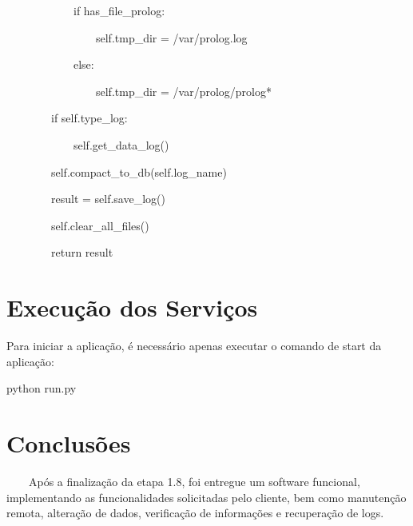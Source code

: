 {\ttfamily\color[rgb]{0.10980392,0.10980392,0.10980392}
    \ \ \ \ \ \ \ \ \ \ \ \ if has\_file\_prolog:}

{\ttfamily\color[rgb]{0.10980392,0.10980392,0.10980392}
    \ \ \ \ \ \ \ \ \ \ \ \ \ \ \ \ self.tmp\_dir = {\textquotedbl}/var/prolog.log{\textquotedbl}}

{\ttfamily\color[rgb]{0.10980392,0.10980392,0.10980392}
    \ \ \ \ \ \ \ \ \ \ \ \ else:}

{\ttfamily\color[rgb]{0.10980392,0.10980392,0.10980392}
    \ \ \ \ \ \ \ \ \ \ \ \ \ \ \ \ self.tmp\_dir = {\textquotedbl}/var/prolog/prolog*{\textquotedbl}}


    \bigskip

{\ttfamily\color[rgb]{0.10980392,0.10980392,0.10980392}
    \ \ \ \ \ \ \ \ if self.type\_log:}

{\ttfamily\color[rgb]{0.10980392,0.10980392,0.10980392}
    \ \ \ \ \ \ \ \ \ \ \ \ self.get\_data\_log()}


    \bigskip

{\ttfamily\color[rgb]{0.10980392,0.10980392,0.10980392}
    \ \ \ \ \ \ \ \ self.compact\_to\_db(self.log\_name)}

{\ttfamily\color[rgb]{0.10980392,0.10980392,0.10980392}
    \ \ \ \ \ \ \ \ result = self.save\_log()}

{\ttfamily\color[rgb]{0.10980392,0.10980392,0.10980392}
    \ \ \ \ \ \ \ \ self.clear\_all\_files()}

{\ttfamily\color[rgb]{0.10980392,0.10980392,0.10980392}
    \ \ \ \ \ \ \ \ return result}


    \bigskip


    \bigskip

    \section{Execu\c{c}\~ao dos Servi\c{c}os}
{\color{black}
    Para iniciar a aplica\c{c}\~ao, \'e necess\'ario apenas executar o comando de start da aplica\c{c}\~ao:}

{\ttfamily\color[rgb]{0.10980392,0.10980392,0.10980392}
    python run.py}


    \bigskip

    \section{Conclus\~oes}

    \bigskip

{\color{black}
    \ \ \ \ Ap\'os a finaliza\c{c}\~ao da etapa 1.8, foi entregue um software funcional, implementando as funcionalidades
        solicitadas pelo cliente, bem como manuten\c{c}\~ao remota, altera\c{c}\~ao de dados, verifica\c{c}\~ao de
        informa\c{c}\~oes e recupera\c{c}\~ao de logs.}


